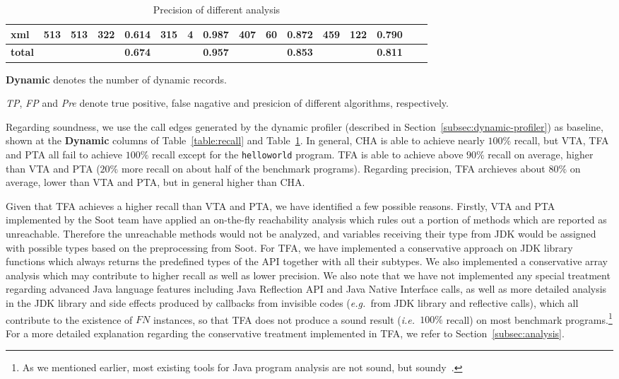 \documentclass{fac}
\newcommand\eg{\textit{e.g.\ }}
\newcommand\ie{\textit{i.e.\ }}
\begin{document}
\begin{table}
\begin{threeparttable}[b]
\begin{tabular*}{1.0\textwidth}{|l|c|c|c|c|c|c|c|c|c|c|c|c|c|c|c|}
xml & 513 & 513 & 322 & 0.614 & 315 & 4 & 0.987 & 407 & 60 & 0.872 & 459 & 122 & 0.790\\
\hline
\textbf{total} & & & & \textbf{0.674} & & & \textbf{0.957} & & & \textbf{0.853} & & & \textbf{0.811} \\
	\hline
\end{tabular*}
\begin{tablenotes}
  \item[1] \textbf{Dynamic} denotes the number of dynamic records.
  \item[2] \textit{TP}, \textit{FP} and \textit{Pre} denote true positive, false nagative and presicion of different algorithms, respectively.
\end{tablenotes}
\end{threeparttable}
\caption{Precision of different analysis}\label{table:precision}
\end{table}


Regarding soundness, we use the call edges generated by the dynamic profiler (described in Section~\ref{subsec:dynamic-profiler}) as baseline, shown at the \textbf{Dynamic} columns of Table~\ref{table:recall} and Table~\ref{table:precision}. In general, CHA is able to achieve nearly $100\%$ recall, but VTA, TFA and PTA all fail to achieve $100\%$ recall except for the \texttt{helloworld} program. TFA is able to achieve above $90\%$ recall on average, higher than VTA and PTA ($20\%$ more recall on about half of the benchmark programs). Regarding precision, TFA archieves about $80\%$ on average, lower than VTA and PTA, but in general higher than CHA.

Given that TFA achieves a higher recall than VTA and PTA, we have identified a few possible reasons. Firstly, VTA and PTA implemented by the Soot team have applied an on-the-fly reachability analysis which rules out a portion of methods which are reported as unreachable. Therefore the unreachable methods would not be analyzed, and variables receiving their type from JDK would be assigned with possible types based on the preprocessing from Soot. For TFA, we have implemented a conservative approach on JDK library functions which always returns the predefined types of the API together with all their subtypes. We also implemented a conservative array analysis which may contribute to higher recall as well as lower precision. We also note that we have not implemented any special treatment regarding advanced Java language features including Java Reflection API and Java Native Interface calls, as well as more detailed analysis in the JDK library and side effects produced by callbacks from invisible codes (\eg from JDK library and reflective calls), which all contribute to the existence of $FN$ instances, so that TFA does not produce a sound result (\ie $100\%$ recall) on most benchmark programs.\footnote{As we mentioned earlier, most existing tools for Java program analysis are not sound, but soundy~\cite{LivshitsSSLACGKMV15}.}
For a more detailed explanation regarding the conservative treatment implemented in TFA, we refer to Section~\ref{subsec:analysis}.
\end{document}
